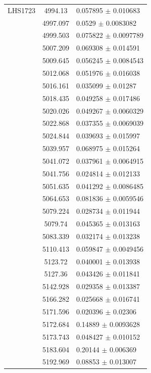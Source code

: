 \begin{longtable}{|c|c|l|}
\hline                                          
LHS1723 & 4994.13 & 0.057895 $\pm$ 0.010683 \\  
 & 4997.097 & 0.0529 $\pm$ 0.0083082 \\         
 & 4999.503 & 0.075822 $\pm$ 0.0097789 \\       
 & 5007.209 & 0.069308 $\pm$ 0.014591 \\        
 & 5009.645 & 0.056245 $\pm$ 0.0084543 \\       
 & 5012.068 & 0.051976 $\pm$ 0.016038 \\        
 & 5016.161 & 0.035099 $\pm$ 0.01287 \\         
 & 5018.435 & 0.049258 $\pm$ 0.017486 \\        
 & 5020.026 & 0.049267 $\pm$ 0.0060329 \\       
 & 5022.868 & 0.037355 $\pm$ 0.0069039 \\       
 & 5024.844 & 0.039693 $\pm$ 0.015997 \\        
 & 5039.957 & 0.068975 $\pm$ 0.015264 \\        
 & 5041.072 & 0.037961 $\pm$ 0.0064915 \\       
 & 5041.756 & 0.024814 $\pm$ 0.012133 \\        
 & 5051.635 & 0.041292 $\pm$ 0.0086485 \\       
 & 5064.653 & 0.081836 $\pm$ 0.0059546 \\       
 & 5079.224 & 0.028734 $\pm$ 0.011944 \\        
 & 5079.74 & 0.045365 $\pm$ 0.013163 \\         
 & 5083.339 & 0.032174 $\pm$ 0.013238 \\        
 & 5110.413 & 0.059847 $\pm$ 0.0049456 \\       
 & 5123.72 & 0.040001 $\pm$ 0.013938 \\         
 & 5127.36 & 0.043426 $\pm$ 0.011841 \\         
 & 5142.928 & 0.029358 $\pm$ 0.013387 \\        
 & 5166.282 & 0.025668 $\pm$ 0.016741 \\        
 & 5171.596 & 0.020396 $\pm$ 0.02306 \\         
 & 5172.684 & 0.14889 $\pm$ 0.0093628 \\        
 & 5173.743 & 0.048427 $\pm$ 0.010152 \\        
 & 5183.604 & 0.20144 $\pm$ 0.006369 \\         
 & 5192.969 & 0.08853 $\pm$ 0.013007 \\         

\end{longtable}
